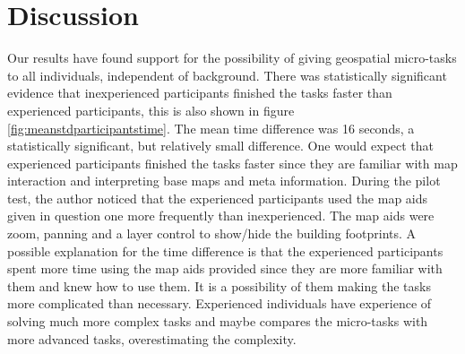 \chapter{Discussion}

Our results have found support for the possibility of giving geospatial micro-tasks to all individuals, independent of background. There was statistically significant evidence that inexperienced participants finished the tasks faster than experienced participants, this is also shown in figure \ref{fig:meanstdparticipantstime}. The mean time difference was 16 seconds, a statistically significant, but relatively small difference. One would expect that experienced participants finished the tasks faster since they are familiar with map interaction and interpreting base maps and meta information. During the pilot test, the author noticed that the experienced participants used the map aids given in question one more frequently than inexperienced. The map aids were zoom, panning and a layer control to show/hide the building footprints. A possible explanation for the time difference is that the experienced participants spent more time using the map aids provided since they are more familiar with them and knew how to use them. It is a possibility of them making the tasks more complicated than necessary. Experienced individuals have experience of solving much more complex tasks and maybe compares the micro-tasks with more advanced tasks, overestimating the complexity.

